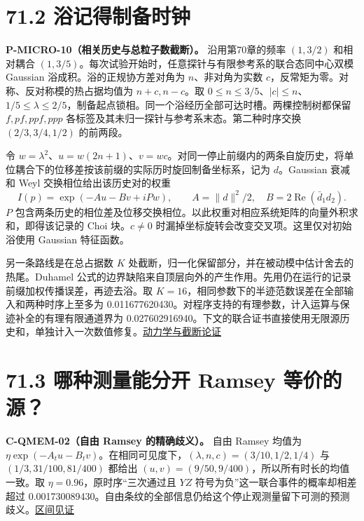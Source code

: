 \documentclass[
  11pt,
  oneside]{book}
\begin{document}
\section{71.2 浴记得制备时钟}

\protect\hypertarget{p-micro-10}{}{}

\textbf{P-MICRO-10（相关历史与总粒子数截断）。} 沿用第70章的频率
\((1,3/2)\) 和相对耦合
\((1,3/5)\)。每次试验开始时，任意探针与有限参考系的联合态同中心双模
Gaussian 浴成积。浴的正规协方差对角为 \(n\)、非对角为实数
\(c\)，反常矩为零。对称、反对称模的热占据均值为 \(n+c,n-c\)。取
\(0\le n\le 3/5\)、\(|c|\le n\)、\(1/5\le\lambda\le2/5\)，制备起点锁相。同一个浴经历全部可达时槽。两棵控制树都保留
\(f,pf,ppf,ppp\) 各标签及其未归一探针与参考系末态。第二种时序交换
\((2/3,3/4,1/2)\) 的前两段。

令
\(w=\lambda^2\)、\(u=w(2n+1)\)、\(v=wc\)。对同一停止前缀内的两条自旋历史，将单位耦合下的位移差按该前缀的实际历时旋回制备坐标系，记为
\(d\)。Gaussian 衰减和 Weyl 交换相位给出该历史对的权重 \[
I(p)=\exp(-Au-Bv+iPw),\qquad A=\|d\|^2/2,\quad B=2\operatorname{Re}(\bar d_1d_2).
\] \(P\)
包含两条历史的相位差及位移交换相位。以此权重对相应系统矩阵的向量外积求和，即得该记录的
Choi 块。\(c\ne0\) 时漏掉坐标旋转会改变交叉项。这里仅对初始浴使用
Gaussian 特征函数。

另一条路线是在总占据数 \(K\)
处截断，归一化保留部分，并在被动模中估计舍去的热尾。Duhamel
公式的边界缺陷来自顶层向外的产生作用。先用仍在运行的记录前缀加权传播误差，再迹去浴。取
\(K=16\)，相同参数下的半迹范数误差在全部输入和两种时序上至多为
0.011677620430。对程序支持的有理参数，计入运算与保迹补全的有理有限通道界为
0.027602916940。下文的联合证书直接使用无限源历史和，单独计入一次数值修复。\href{../correlated_bath/dynamics/DYNAMICS.md}{动力学与截断论证}

\section{71.3 哪种测量能分开 Ramsey 等价的源？}

\protect\hypertarget{c-qmem-02}{}{}

\textbf{C-QMEM-02（自由 Ramsey 的精确歧义）。} 自由 Ramsey 均值为
\(\eta\exp(-A_tu-B_tv)\)。在相同可见度下，\((\lambda,n,c)=(3/10,1/2,1/4)\)
与 \((1/3,31/100,81/400)\) 都给出
\((u,v)=(9/50,9/400)\)，所以所有时长的均值一致。取
\(\eta=0.96\)，原时序``三次通过且 \(YZ\)
符号为负''这一联合事件的概率却相差超过
0.001730089430。自由条纹的全部信息仍给这个停止观测量留下可测的预测歧义。\href{../correlated_bath/inference/verification.json}{区间见证}
\end{document}
